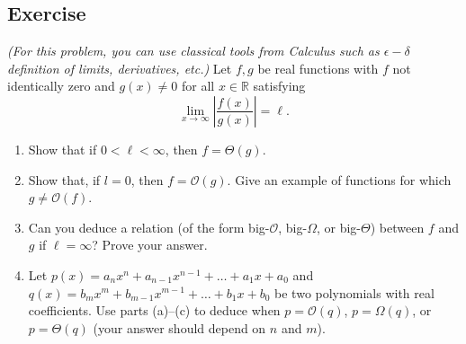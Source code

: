 \documentclass{article}
\newcounter{counter}
\newcommand{\Exercise}{Exercise \stepcounter{counter}\thecounter}
\begin{document}
\subsection*{\Exercise}
    \textit{(For this problem, you can use classical tools from Calculus such as $\epsilon-\delta$ definition of limits, derivatives, etc.)} Let $f, g$ be real functions with $f$ not identically zero and $g(x) \ne 0$ for all $x \in \mathbb{R}$ satisfying $$\lim_{x \rightarrow \infty} \left|\frac{f(x)}{g(x)}\right| = \ell.$$
    \begin{enumerate}
        \item Show that if $0 < \ell < \infty$, then $f = \Theta(g)$.
        \item Show that, if $l = 0$, then $f = \mathcal{O}(g)$. Give an example of functions for which $g \ne \mathcal{O}(f)$.
        \item Can you deduce a relation (of the form big-$\mathcal{O}$, big-$\Omega$, or big-$\Theta$) between $f$ and $g$ if $\ell = \infty$? Prove your answer.
        \item Let $p(x) = a_{n}x^{n} + a_{n - 1}x^{n - 1} + \dots + a_{1}x + a_{0}$ and $q(x) = b_{m}x^{m} + b_{m - 1}x^{m - 1} + \dots + b_{1}x + b_{0}$ be two polynomials with real coefficients. Use parts (a)--(c) to deduce when $p = \mathcal{O}(q)$, $p = \Omega(q)$, or $p = \Theta(q)$ (your answer should depend on $n$ and $m$).
    \end{enumerate}
\end{document}
